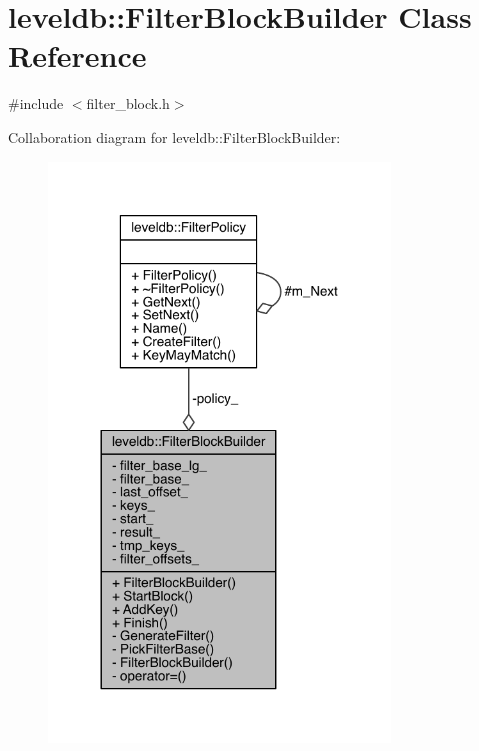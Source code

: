\hypertarget{classleveldb_1_1_filter_block_builder}{}\section{leveldb\+:\+:Filter\+Block\+Builder Class Reference}
\label{classleveldb_1_1_filter_block_builder}


{\ttfamily \#include $<$filter\+\_\+block.\+h$>$}



Collaboration diagram for leveldb\+:\+:Filter\+Block\+Builder\+:\nopagebreak
\begin{figure}[H]
\begin{center}
\leavevmode
\includegraphics[width=257pt]{classleveldb_1_1_filter_block_builder__coll__graph}
\end{center}
\end{figure}
